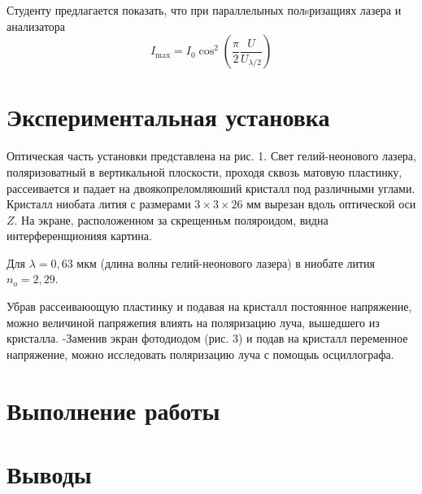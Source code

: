 \documentclass[a4paper, 12pt]{article}
\begin{document}
Студенту предлагается показать, что при параллелыных полsризащиях лазера и анализатора
\begin{equation}
I_{\mathrm{max}}=I_0 \cos ^2\left(\frac{\pi}{2} \frac{U}{U_{\lambda / 2}}\right)
\end{equation}

\section{Экспериментальная установка}
Оптическая часть установки представлена на рис. 1. Свет гелий-неонового лазера, поляризоватный в вертикальной плоскости, проходя сквозь матовую пластинку, рассеивается и падает на двоякопреломляюший кристалл под различными углами. Кристалл ниобата лития с размерами $3 \times 3 \times 26$ мм вырезан вдоль оптической оси $Z$. На экране, расположенном за скрещенньм поляроидом, видна интерференщионияя картина.

Для $\lambda=0,63$ мкм (длина волны гелий-неонового лазера) в ниобате лития $n_o=2,29$.

Убрав рассеиваюощую пластинку и подавая на кристалл постоянное напряжение, можно величиной папряжепия влиять на поляризацию луча, вышедшего из кристалла.
-Заменив экран фотодиодом (рис. 3) и подав на кристалл переменное напряжение, можно исследовать поляризацию луча с помощыь осциллографа.
\section{Выполнение работы}

\section{Выводы}
\end{document}
